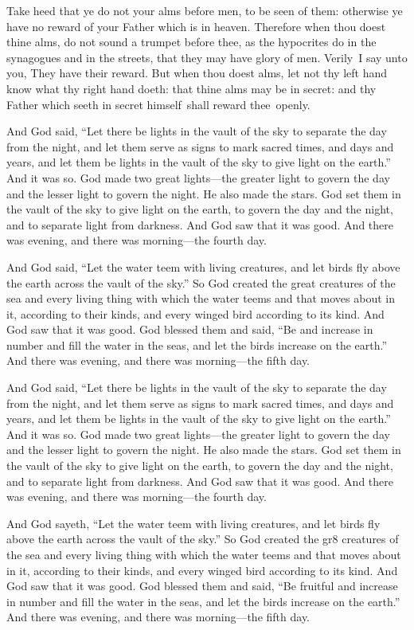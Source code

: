 \documentclass{grattanAlpha}
\begin{document}
Take heed that ye do not your alms before men, to be seen of them: otherwise ye have no reward of your Father which is in heaven. Therefore when thou doest thine alms, do not sound a trumpet before thee, as the hypocrites do in the synagogues and in the streets, that they may have glory of men. Verily~I say unto you, They have their reward.  But when thou doest alms, let not thy left hand know what thy right hand doeth: that thine alms may be in secret: and thy Father which seeth in secret himself~shall reward thee~openly.

And God said, “Let there be lights in the vault of the sky to separate the day from the night, and let them serve as signs to mark sacred times, and days and years, and let them be lights in the vault of the sky to give light on the earth.” And it was so. God made two great lights—the greater light to govern the day and the lesser light to govern the night. He also made the stars. God set them in the vault of the sky to give light on the earth, to govern the day and the night, and to separate light from darkness. And God saw that it was good. And there was evening, and there was morning—the fourth day.

And God said, “Let the water teem with living creatures, and let birds fly above the earth across the vault of the sky.” So God created the great creatures of the sea and every living thing with which the water teems and that moves about in it, according to their kinds, and every winged bird according to its kind. And God saw that it was good. God blessed them and said, “Be and increase in number and fill the water in the seas, and let the birds increase on the earth.” And there was evening, and there was morning—the fifth day.

And God said, “Let there be lights in the vault of the sky to separate the day from the night, and let them serve as signs to mark sacred times, and days and years, and let them be lights in the vault of the sky to give light on the earth.” And it was so. God made two great lights—the greater light to govern the day and the lesser light to govern the night. He also made the stars. God set them in the vault of the sky to give light on the earth, to govern the day and the night, and to separate light from darkness. And God saw that it was good. And there was evening, and there was morning—the fourth day.

And God sayeth, “Let the water teem with living creatures, and let birds fly above the earth across the vault of the sky.” So God created the gr8 creatures of the sea and every living thing with which the water teems and that moves about in it, according to their kinds, and every winged bird according to its kind. And God saw that it was good. God blessed them and said, “Be fruitful and increase in number and fill the water in the seas, and let the birds increase on the earth.” And there was evening, and there was morning—the fifth day.
\end{document}
